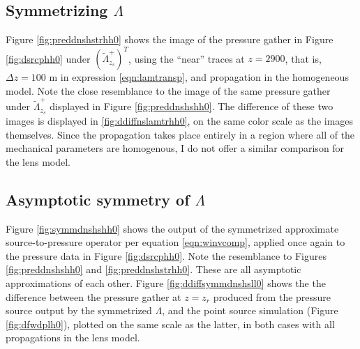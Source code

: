 \subsection{Symmetrizing $\Lambda$}

Figure \ref{fig:preddnshstrhh0} shows the image of the pressure gather
in Figure \ref{fig:dsrcphh0} under $(\tilde{\Lambda}^+_{z_s})^T$,
using the ``near'' traces at $z=2900$, that is, $\Delta z = 100$ m in
expression \ref{eqn:lamtransp}, and propagation in the
homogeneous model. Note
the close resemblance to the image of the same pressure gather under
$\tilde{\Lambda}^+_{z_s}$ displayed in Figure
\ref{fig:preddnshshh0}. The difference of these two images is
displayed in \ref{fig:ddiffnslamtrhh0}, on the same color scale as the
images themselves. Since the propagation takes place entirely in a
region where all of the mechanical parameters are homogenous, I do not
offer a similar comparison for the lens model.



\subsection{Asymptotic symmetry of $\Lambda$}

Figure \ref{fig:symmdnshshh0} shows the output of the symmetrized
approximate source-to-pressure operator per equation \ref{eqn:winvcomp},
applied once again to the pressure data in Figure
\ref{fig:dsrcphh0}. Note the resemblance to Figures
\ref{fig:preddnshshh0} and \ref{fig:preddnshstrhh0}. These are all
asymptotic approximations of each other. Figure
\ref{fig:ddiffsymmdnshsll0} shows the
 the difference between the pressure gather at $z=z_r$ produced from
 the pressure source output by the symmetrized $\Lambda$, and the point source
simulation (Figure \ref{fig:dfwdplh0}), plotted on the same scale as
the latter, in both cases with all propagations in the lens model.

